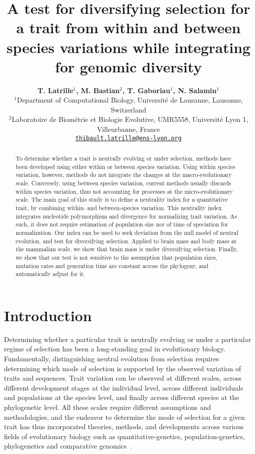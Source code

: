 \documentclass{article}
\title{A test for diversifying selection for a trait from within and between species variations while integrating for genomic diversity}
\author{
\large
\textbf{T. {Latrille}$^{1}$\orcidlink{0000-0002-9643-4668}, M. {Bastian}$^{2}$, T. {Gaboriau}$^{1}$\orcidlink{0000-0001-7530-2204}, N. {Salamin}$^{1}$\orcidlink{0000-0002-3963-4954}}\\
\normalsize
$^{1}$Department of Computational Biology, Université de Lausanne, Lausanne, Switzerland\\
$^{2}$Laboratoire de Biométrie et Biologie Evolutive, UMR5558, Université Lyon 1, Villeurbanne, France \\
\texttt{\href{mailto:thibault.latrille@ens-lyon.org}{thibault.latrille@ens-lyon.org}} \\
}
\begin{document}
\maketitle

\begin{abstract}
    To determine whether a trait is neutrally evolving or under selection, methods have been developed using either within or between species variation.
    Using within species variation, however, methods do not integrate the changes at the macro-evolutionary scale.
    Conversely, using between species variation, current methods usually discards within species variation, thus not accounting for processes at the micro-evolutionary scale.
    The main goal of this study is to define a neutrality index for a quantitative trait, by combining within- and between-species variation.
    This neutrality index integrates nucleotide polymorphism and divergence for normalizing trait variation.
    As such, it does not require estimation of population size nor of time of speciation for normalization.
    Our index can be used to seek deviation from the null model of neutral evolution, and test for diversifying selection.
    Applied to brain mass and body mass at the mammalian scale, we show that brain mass is under diversifying selection.
    Finally, we show that our test is not sensitive to the assumption that population sizes, mutation rates and generation time are constant across the phylogeny, and automatically adjust for it.
\end{abstract}


\section*{Introduction}\label{sec:introduction}

Determining whether a particular trait is neutrally evolving or under a particular regime of selection has been a long-standing goal in evolutionary biology.
Fundamentally, distinguishing neutral evolution from selection requires determining which mode of selection is supported by the observed variation of traits and sequences.
Trait variation can be observed at different scales, across different development stages at the individual level, across different individuals and populations at the species level, and finally across different species at the phylogenetic level.
All these scales require different assumptions and methodologies, and the endeavor to determine the mode of selection for a given trait has thus incorporated theories, methods, and developments across various fields of evolutionary biology such as quantitative-genetics, population-genetics, phylogenetics and comparative genomics~\cite{lynch_genetics_1998, walsh_evolution_2018}.
\end{document}
